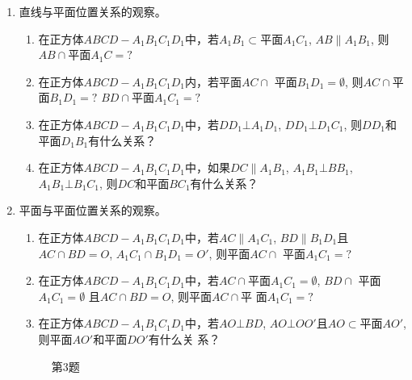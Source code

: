 \begin{enumerate}
\item 直线与平面位置关系的观察。
\begin{enumerate}
  \item 在正方体$ABCD-A_1B_1C_1D_1$中，若$A_1B_1\subset$平面$A_1C_1$, 
  $AB\parallel A_1B_1$, 则$AB\cap $平面$A_1C=?$
  \item 在正方体$ABCD-A_1B_1C_1D_1$内，若平面$AC\cap $
  平面$B_1D_1=\emptyset$, 则$AC\cap $平面$B_1D_1=?$ $BD\cap $平面$A_1C_1=?$
  \item 在正方体$ABCD-A_1B_1C_1D_1$中，若$DD_1\bot A_1D_1$, 
  $DD_1\bot D_1C_1$, 则$DD_1$和平面$D_1B_1$有什么关系？
  \item 在正方体$ABCD-A_1B_1C_1D_1$中，如果$DC\parallel A_1B_1$, 
  $A_1B_1\bot BB_1$, $A_1B_1\bot B_1C_1$, 则$DC$和平面$BC_1$有什么关系？
\end{enumerate}

\item 平面与平面位置关系的观察。
\begin{enumerate}
  \item 在正方体$ABCD-A_1B_1C_1D_1$中，若$AC\parallel A_1C_1$, 
  $BD\parallel B_1D_1$且$AC\cap BD=O$, $A_1C_1\cap B_1D_1=O'$, 则平面$AC\cap$
  平面$A_1C_1=?$
  \item 在正方体$ABCD-A_1B_1C_1D_1$中，若$AC\cap$平面$A_1C_1
  =\emptyset$, $BD\cap $ 平面$A_1C_1=\emptyset$ 且$AC\cap BD=O$, 则平面$AC\cap $平
  面$A_1C_1=?$
  \item 在正方体$ABCD-A_1B_1C_1D_1$中，若$AO\bot BD$, $AO\bot 
  OO'$且$AO\subset $平面$AO'$, 则平面$AO'$和平面$DO'$有什么关
  系？
\end{enumerate}

\begin{figure}[htp]
  \centering
  \caption*{第3题}
\end{figure}

\end{enumerate}


